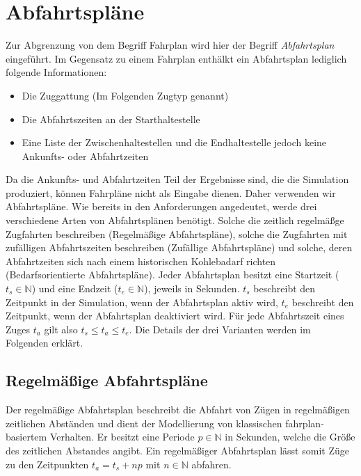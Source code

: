 \section{Abfahrtspläne}

Zur Abgrenzung von dem Begriff Fahrplan wird hier der Begriff \emph{Abfahrtsplan} eingeführt. Im Gegensatz zu einem Fahrplan enthälkt ein Abfahrtsplan lediglich folgende Informationen:
\begin{itemize}
    \item Die Zuggattung (Im Folgenden Zugtyp genannt)
    \item Die Abfahrtszeiten an der Starthaltestelle
    \item Eine Liste der Zwischenhaltestellen und die Endhaltestelle jedoch keine Ankunfts- oder Abfahrtzeiten
\end{itemize}
Da die Ankunfts- und Abfahrtzeiten Teil der Ergebnisse sind, die die Simulation produziert, können Fahrpläne nicht als Eingabe dienen. Daher verwenden wir Abfahrtspläne. Wie bereits in den Anforderungen angedeutet, werde drei verschiedene Arten von Abfahrtsplänen benötigt. Solche die zeitlich regelmäßge Zugfahrten beschreiben (Regelmäßige Abfahrtspläne), solche die Zugfahrten mit zufälligen Abfahrtszeiten beschreiben (Zufällige Abfahrtspläne) und solche, deren Abfahrtzeiten sich nach einem historischen Kohlebadarf richten (Bedarfsorientierte Abfahrtspläne). Jeder Abfahrtsplan besitzt eine Startzeit ($t_s \in \mathbb{N}$) und eine Endzeit ($t_e \in \mathbb{N}$), jeweils in Sekunden. $t_s$ beschreibt den Zeitpunkt in der Simulation, wenn der Abfahrtsplan aktiv wird, $t_e$ beschreibt den Zeitpunkt, wenn der Abfahrtsplan deaktiviert wird. Für jede Abfahrtszeit eines Zuges $t_a$ gilt also $t_s\leq t_a \leq t_e$. Die Details der drei Varianten werden im Folgenden erklärt.

\subsection{Regelmäßige Abfahrtspläne}

Der regelmäßige Abfahrtsplan beschreibt die Abfahrt von Zügen in regelmäßigen zeitlichen Abständen und dient der Modellierung von klassischen fahrplan-basiertem Verhalten. Er besitzt eine Periode $p\in\mathbb{N}$ in Sekunden, welche die Größe des zeitlichen Abstandes angibt. Ein regelmäßiger Abfahrtsplan lässt somit Züge zu den Zeitpunkten $t_a=t_s+np$ mit $n\in\mathbb{N}$ abfahren.

